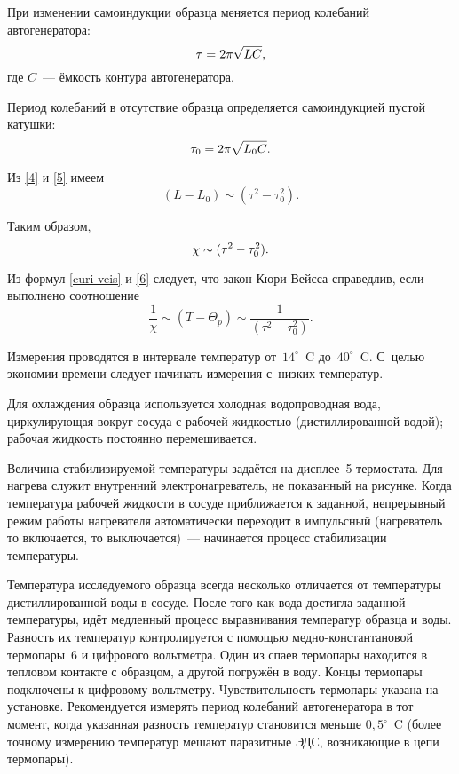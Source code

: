 При изменении самоиндукции образца меняется период колебаний автогенератора:
\begin{equation}%
	\tau=2\pi\sqrt{LC},
	\eqmark{4}
\end{equation}
где $C$~--- ёмкость контура автогенератора.

Период колебаний в отсутствие образца определяется самоиндукцией пустой катушки:
\begin{equation}%
	\tau_0=2\pi\sqrt{L_0 C}.
	\eqmark{5}
\end{equation}

Из \eqref{4} и \eqref{5} имеем
\begin{equation*}
	(L-L_0)\sim (\tau^2-\tau_0^2).
\end{equation*}

Таким образом,
\begin{equation}%
	\eqmark{6}
	\chi\sim (\tau^2-\tau_0^2).
\end{equation}

Из формул \eqref{curi-veis} и \eqref{6} следует, что закон Кюри-Вейсса справедлив, если выполнено соотношение
\begin{equation}
	\frac{1}{\chi}\sim(T-\Theta_p)\sim\frac{1}{(\tau^2-\tau_0^2)}.
\end{equation}

Измерения проводятся в интервале температур от~$14^\circ$~C до~$40^\circ$~C. С~целью экономии времени следует начинать измерения
с~низких температур.

Для охлаждения образца используется холодная водопроводная вода, циркулирующая вокруг сосуда с рабочей жидкостью
(дистиллированной водой); рабочая жидкость постоянно перемешивается.

Величина стабилизируемой температуры задаётся на дисплее~5 термостата. Для нагрева служит внутренний электронагреватель,
не показанный на рисунке. Когда температура рабочей жидкости в сосуде приближается к заданной, непрерывный режим работы
нагревателя автоматически переходит в импульсный (нагреватель то включается, то выключается)~--- начинается процесс
стабилизации температуры.

Температура исследуемого образца всегда несколько отличается от температуры дистиллированной воды в сосуде. После того
как вода достигла заданной температуры, идёт медленный процесс выравнивания температур образца и воды. Разность их
температур контролируется с помощью медно-константановой термопары~6 и цифрового вольтметра. Один из спаев термопары
находится в тепловом контакте с образцом, а другой погружён в воду. Концы термопары подключены к цифровому вольтметру.
Чувствительность термопары указана на установке. Рекомендуется измерять период колебаний автогенератора в тот момент,
когда указанная разность температур становится меньше $0,5^\circ$~C (более точному измерению температур мешают паразитные ЭДС,
возникающие в цепи термопары).

